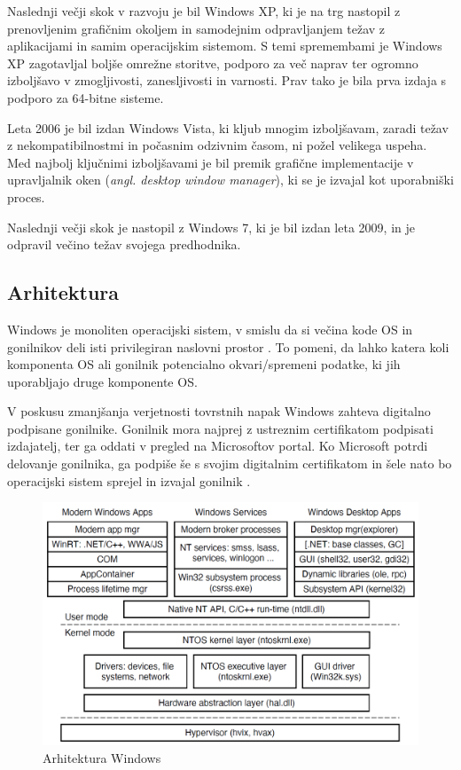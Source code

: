 \documentclass[a4paper,12pt,openright]{book}
\begin{document}
Naslednji večji skok v razvoju je bil Windows XP, ki je na trg nastopil z prenovljenim grafičnim okoljem in samodejnim odpravljanjem težav z aplikacijami in samim operacijskim sistemom.
S temi spremembami je Windows XP zagotavljal boljše omrežne storitve, podporo za več naprav ter ogromno izboljšavo v zmogljivosti, zanesljivosti in varnosti.
Prav tako je bila prva izdaja s podporo za 64-bitne sisteme.

Leta 2006 je bil izdan Windows Vista, ki kljub mnogim izboljšavam, zaradi težav z nekompatibilnostmi in počasnim odzivnim časom, ni požel velikega uspeha.
Med najbolj ključnimi izboljšavami je bil premik grafične implementacije v upravljalnik oken (\textit{angl. desktop window manager}), ki se je izvajal kot uporabniški proces.

Naslednji večji skok je nastopil z Windows 7, ki je bil izdan leta 2009, in je odpravil večino težav svojega predhodnika.

\subsection{Arhitektura} \label{ssec:windows:architecture}

Windows je monoliten operacijski sistem, v smislu da si večina kode OS in gonilnikov deli isti privilegiran naslovni prostor \cite{Yosifovich_Russinovich_Solomon_Ionescu_2017}.
To pomeni, da lahko katera koli komponenta OS ali gonilnik potencialno okvari/spremeni podatke, ki jih uporabljajo druge komponente OS.

V poskusu zmanjšanja verjetnosti tovrstnih napak Windows zahteva digitalno podpisane gonilnike.
Gonilnik mora najprej z ustreznim certifikatom podpisati izdajatelj, ter ga oddati v pregled na Microsoftov portal.
Ko Microsoft potrdi delovanje gonilnika, ga podpiše še s svojim digitalnim certifikatom in šele nato bo operacijski sistem sprejel in izvajal gonilnik \cite{Yosifovich_Russinovich_Solomon_Ionescu_2017}.

\begin{figure}[h!]
	\begin{center}
		\includegraphics[width=\textwidth]{images/windows_programming_layers.png}
	\end{center}
	\caption{Arhitektura Windows \cite{Tanenbaum_Bos_2023}}
	\label{fig:windows_architecture}
\end{figure}
\end{document}
